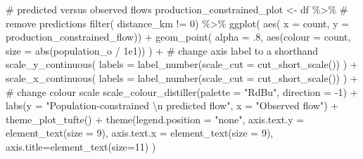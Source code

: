 \documentclass[
  a4paper, 
  twoside,
  final
]{article}
\newenvironment{Shaded}{\begin{snugshade}}{\end{snugshade}}
\newcommand{\AttributeTok}[1]{\textcolor[rgb]{0.40,0.45,0.13}{#1}}
\newcommand{\CommentTok}[1]{\textcolor[rgb]{0.37,0.37,0.37}{#1}}
\newcommand{\DecValTok}[1]{\textcolor[rgb]{0.68,0.00,0.00}{#1}}
\newcommand{\FloatTok}[1]{\textcolor[rgb]{0.68,0.00,0.00}{#1}}
\newcommand{\FunctionTok}[1]{\textcolor[rgb]{0.28,0.35,0.67}{#1}}
\newcommand{\NormalTok}[1]{\textcolor[rgb]{0.00,0.23,0.31}{#1}}
\newcommand{\OtherTok}[1]{\textcolor[rgb]{0.00,0.23,0.31}{#1}}
\newcommand{\SpecialCharTok}[1]{\textcolor[rgb]{0.37,0.37,0.37}{#1}}
\newcommand{\StringTok}[1]{\textcolor[rgb]{0.13,0.47,0.30}{#1}}
\begin{document}
\begin{Shaded}
\begin{Highlighting}[]
\CommentTok{\# predicted versus observed flows}
\NormalTok{production\_constrained\_plot }\OtherTok{\textless{}{-}}\NormalTok{ df }\SpecialCharTok{\%\textgreater{}\%} 
  \CommentTok{\# remove predictions}
  \FunctionTok{filter}\NormalTok{( distance\_km }\SpecialCharTok{!=} \DecValTok{0}\NormalTok{) }\SpecialCharTok{\%\textgreater{}\%} 
  \FunctionTok{ggplot}\NormalTok{( }\FunctionTok{aes}\NormalTok{( }\AttributeTok{x =}\NormalTok{ count, }\AttributeTok{y =}\NormalTok{ production\_constrained\_flow)) }\SpecialCharTok{+}
  \FunctionTok{geom\_point}\NormalTok{( }\AttributeTok{alpha =}\NormalTok{ .}\DecValTok{8}\NormalTok{, }\FunctionTok{aes}\NormalTok{(}\AttributeTok{colour =}\NormalTok{ count, }
                              \AttributeTok{size =} \FunctionTok{abs}\NormalTok{(population\_o }\SpecialCharTok{/} \FloatTok{1e1}\NormalTok{)) ) }\SpecialCharTok{+}
  \CommentTok{\# change axis label to a shorthand}
  \FunctionTok{scale\_y\_continuous}\NormalTok{(}
    \AttributeTok{labels =} \FunctionTok{label\_number}\NormalTok{(}\AttributeTok{scale\_cut =} \FunctionTok{cut\_short\_scale}\NormalTok{())}
\NormalTok{    ) }\SpecialCharTok{+} 
  \FunctionTok{scale\_x\_continuous}\NormalTok{(}
    \AttributeTok{labels =} \FunctionTok{label\_number}\NormalTok{(}\AttributeTok{scale\_cut =} \FunctionTok{cut\_short\_scale}\NormalTok{())}
\NormalTok{    ) }\SpecialCharTok{+} 
  \CommentTok{\# change colour scale}
  \FunctionTok{scale\_colour\_distiller}\NormalTok{(}\AttributeTok{palette =} \StringTok{"RdBu"}\NormalTok{, }\AttributeTok{direction =} \SpecialCharTok{{-}}\DecValTok{1}\NormalTok{) }\SpecialCharTok{+}
  \FunctionTok{labs}\NormalTok{(}\AttributeTok{y =} \StringTok{"Population{-}constrained }\SpecialCharTok{\textbackslash{}n}\StringTok{ predicted flow"}\NormalTok{,}
       \AttributeTok{x =} \StringTok{"Observed flow"}\NormalTok{) }\SpecialCharTok{+}
  \FunctionTok{theme\_plot\_tufte}\NormalTok{() }\SpecialCharTok{+}
  \FunctionTok{theme}\NormalTok{(}\AttributeTok{legend.position =} \StringTok{"none"}\NormalTok{,}
        \AttributeTok{axis.text.y =} \FunctionTok{element\_text}\NormalTok{(}\AttributeTok{size =} \DecValTok{9}\NormalTok{),}
        \AttributeTok{axis.text.x =} \FunctionTok{element\_text}\NormalTok{(}\AttributeTok{size =} \DecValTok{9}\NormalTok{),}
        \AttributeTok{axis.title=}\FunctionTok{element\_text}\NormalTok{(}\AttributeTok{size=}\DecValTok{11}\NormalTok{)}
\NormalTok{        )}


\end{Highlighting}
\end{Shaded}
\end{document}
